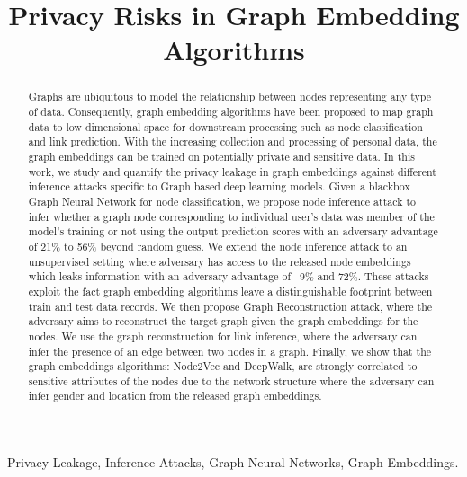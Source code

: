 \documentclass[conference]{IEEEtran}
\begin{document}

\title{Privacy Risks in Graph Embedding Algorithms}


\author{
}




\maketitle

\begin{abstract}
Graphs are ubiquitous to model the relationship between nodes representing any type of data.
Consequently, graph embedding algorithms have been proposed to map graph data to low dimensional space for downstream processing such as node classification and link prediction.
With the increasing collection and processing of personal data, the graph embeddings can be trained on potentially private and sensitive data.
In this work, we study and quantify the privacy leakage in graph embeddings against different inference attacks specific to Graph based deep learning models.
Given a blackbox Graph Neural Network for node classification, we propose node inference attack to infer whether a graph node corresponding to individual user's data was member of the model's training or not using the output prediction scores with an adversary advantage of 21\% to 56\% beyond random guess.
We extend the node inference attack to an unsupervised setting where adversary has access to the released node embeddings which leaks information with an adversary advantage of ~9\% and 72\%.
These attacks exploit the fact graph embedding algorithms leave a distinguishable footprint between train and test data records.
We then propose Graph Reconstruction attack, where the adversary aims to reconstruct the target graph given the graph embeddings for the nodes.
We use the graph reconstruction for link inference, where the adversary can infer the presence of an edge between two nodes in a graph.
Finally, we show that the graph embeddings algorithms: Node2Vec and DeepWalk, are strongly correlated to sensitive attributes of the nodes due to the network structure where the adversary can infer gender and location from the released graph embeddings.
\end{abstract}

\begin{IEEEkeywords}
Privacy Leakage, Inference Attacks, Graph Neural Networks, Graph Embeddings.
\end{IEEEkeywords}










{\footnotesize


}
\end{document}
